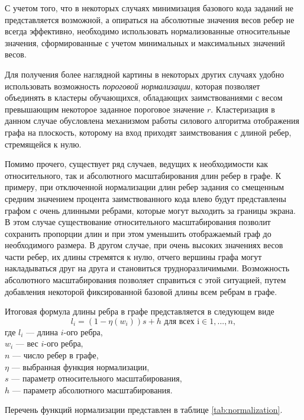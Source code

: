 \documentclass[a4paper,14pt]{extarticle}
\begin{document}
С учетом того, что в некоторых случаях минимизация базового кода заданий не представляется возможной, а опираться на абсолютные значения весов ребер не всегда эффективно, необходимо использовать нормализованные относительные значения, сформированные с учетом минимальных и максимальных значений весов.

Для получения более наглядной картины в некоторых других случаях удобно использовать возможность \textit{пороговой нормализации}, которая позволяет объединять в кластеры обучающихся, обладающих заимствованиями с весом превышающим некоторое заданное пороговое значение $r$. Кластеризация в данном случае обусловлена механизмом работы силового алгоритма отображения графа на плоскость, которому на вход приходят заимствования с длиной ребер, стремящейся к нулю.

Помимо прочего, существует ряд случаев, ведущих к необходимости как относительного, так и абсолютного масштабирования длин ребер в графе. К примеру, при отключенной нормализации длин ребер задания со смещенным средним значением процента заимствованного кода влево будут представлены графом с очень длинными ребрами, которые могут выходить за границы экрана. В этом случае существование относительного масштабирования позволит сохранить пропорции длин и при этом уменьшить отображаемый граф до необходимого размера. В другом случае, при очень высоких значениях весов части ребер, их длины стремятся к нулю, отчего вершины графа могут накладываться друг на друга и становиться трудноразличимыми. Возможность абсолютного масштабирования позволяет справиться с этой ситуацией, путем добавления некоторой фиксированной базовой длины всем ребрам в графе.

Итоговая формула длины ребра в графе представляется в следующем виде
\begin{equation}
    l_i = (1-\eta(w_i))s+h \text{ для всех i} \in 1, ..., n,
\end{equation}
где $l_i$ --- длина $i$-ого ребра,
\\$w_i$ --- вес $i$-ого ребра,
\\$n$ --- число ребер в графе,
\\$\eta$ --- выбранная функция нормализации,
\\$s$ --- параметр относительного масштабирования,
\\$h$ --- параметр абсолютного масштабирования.

Перечень функций нормализации представлен в таблице \ref{tab:normalization}.
\end{document}
